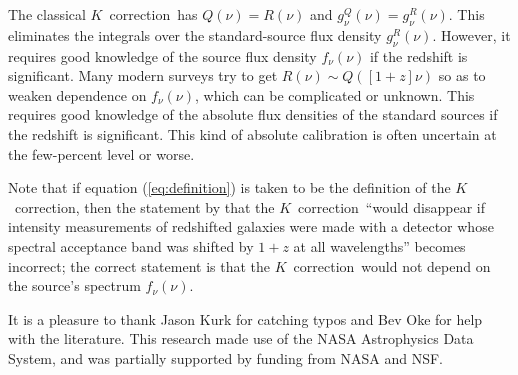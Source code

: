 \documentclass[preprint]{aastex}
\newcommand{\kcorrection}{$K$~correction}
\begin{document}
The classical \kcorrection\ has $Q(\nu)=R(\nu)$ and
$g^Q_{\nu}(\nu)=g^R_{\nu}(\nu)$.  This eliminates the integrals over
the standard-source flux density $g^R_{\nu}(\nu)$.  However, it
requires good knowledge of the source flux density $f_{\nu}(\nu)$ if
the redshift is significant.  Many modern surveys try to get
$R(\nu)\sim Q([1+z]\nu)$ so as to weaken dependence on $f_{\nu}(\nu)$,
which can be complicated or unknown.  This requires good knowledge of
the absolute flux densities of the standard sources if the redshift is
significant.  This kind of absolute calibration is often uncertain at
the few-percent level or worse.

Note that if equation (\ref{eq:definition}) is taken to be the
definition of the \kcorrection, then the statement by \citet{oke68a}
that the \kcorrection\ ``would disappear if intensity measurements of
redshifted galaxies were made with a detector whose spectral
acceptance band was shifted by $1+z$ at all wavelengths'' becomes
incorrect; the correct statement is that the \kcorrection\ would not
depend on the source's spectrum $f_{\nu}(\nu)$.

\acknowledgements It is a pleasure to thank Jason Kurk for catching
typos and Bev Oke for help with the literature.  This research made
use of the NASA Astrophysics Data System, and was partially supported
by funding from NASA and NSF.



\end{document}
